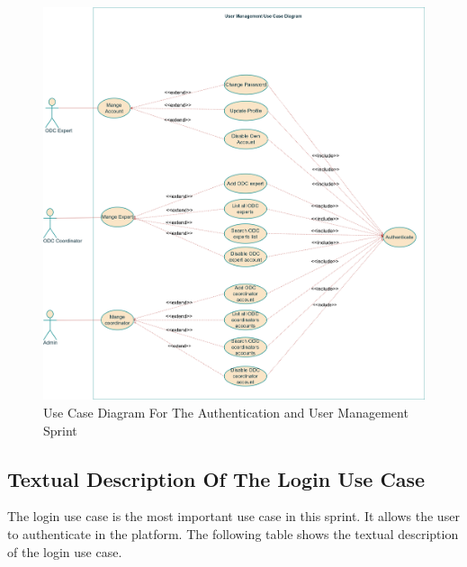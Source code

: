 \begin{figure}[h!]
    \centering
    \includegraphics[height=1\textwidth]{images/userManagementUseCase.png}
    \caption{Use Case Diagram For The Authentication and User Management Sprint}
    \label{fig:Use Case Diagram for Sprint 1}
\end{figure}

\subsection{Textual Description Of The Login Use Case}
The login use case is the most important use case in this sprint. It allows the user to authenticate in the platform.
The following table shows the textual description of the login use case.

